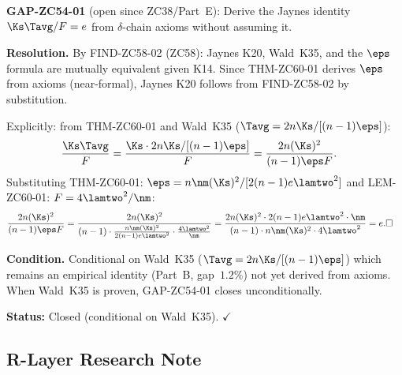 \documentclass[12pt, a4paper]{article}
\begin{document}
\begin{formalbox}[title={COR-ZC60-03: GAP-ZC54-01 Closed ---
  Jaynes K20 from Axioms (Conditional) ($R_0$)}]
\textbf{GAP-ZC54-01} (open since ZC38/Part~E):
Derive the Jaynes identity $\Ks\Tavg/F = e$ from
$\delta$-chain axioms without assuming it.

\medskip
\textbf{Resolution.}
By FIND-ZC58-02 (ZC58): Jaynes K20, Wald~K35, and the
$\eps$ formula are mutually equivalent given K14.
Since THM-ZC60-01 derives $\eps$ from axioms (near-formal),
Jaynes K20 follows from FIND-ZC58-02 by substitution.

Explicitly: from THM-ZC60-01 and Wald~K35
($\Tavg = 2n\Ks/[(n-1)\eps]$):
\begin{align*}
  \frac{\Ks\Tavg}{F}
  &= \frac{\Ks\cdot 2n\Ks/[(n-1)\eps]}{F}
  = \frac{2n(\Ks)^2}{(n-1)\eps F}.
\end{align*}
Substituting THM-ZC60-01: $\eps = n\nm(\Ks)^2/[2(n-1)e\lamtwo^2]$
and LEM-ZC60-01: $F = 4\lamtwo^2/\nm$:
\begin{align*}
  \frac{2n(\Ks)^2}{(n-1)\eps F}
  &= \frac{2n(\Ks)^2}{(n-1)\cdot\frac{n\nm(\Ks)^2}{2(n-1)e\lamtwo^2}\cdot\frac{4\lamtwo^2}{\nm}}
  = \frac{2n(\Ks)^2\cdot 2(n-1)e\lamtwo^2\cdot\nm}{(n-1)\cdot n\nm(\Ks)^2\cdot 4\lamtwo^2}
  = e. \hfill\square
\end{align*}

\textbf{Condition.}
Conditional on Wald~K35 ($\Tavg = 2n\Ks/[(n-1)\eps]$) which
remains an empirical identity (Part~B, gap~$1.2\%$) not yet
derived from axioms.  When Wald~K35 is proven, GAP-ZC54-01
closes unconditionally.

\textbf{Status:} Closed (conditional on Wald~K35). $\checkmark$
\end{formalbox}

\subsection{R-Layer Research Note}
\label{sec:rlayer}
\end{document}
